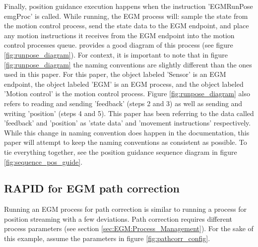 \documentclass{cslthse-msc}
\begin{document}
Finally, position guidance execution happens when the instruction 'EGMRunPose emgProc' is called. While running, the EGM process will: sample the state from the motion control process, send the state data to the EGM endpoint, and place any motion instructions it receives from the EGM endpoint into the motion control processes queue. \cite[Sec. 9.3.2.3]{ABB:controller_software} provides a good diagram of this process (see figure \ref{fig:runpose_diagram}). For context, it is important to note that in figure \ref{fig:runpose_diagram} the naming conventions are slightly different than the ones used in this paper. For this paper, the object labeled 'Sensor' is an EGM endpoint, the object labeled 'EGM' is an EGM process, and the object labeled 'Motion control' is the motion control process. Figure \ref{fig:runpose_diagram} also refers to reading and sending 'feedback' (steps 2 and 3) as well as sending and writing 'position' (steps 4 and 5). This paper has been referring to the data called 'feedback' and 'position' as 'state data' and 'movement instructions' respectively. While this change in naming convention does happen in the documentation, this paper will attempt to keep the naming conventions as consistent as possible. To tie everything together, see the position guidance sequence diagram in figure \ref{fig:sequence_pos_guide}. \par






\subsection{RAPID for EGM path correction}
\label{sec:EGM:Rapid_Programs:corr}
Running an EGM process for path correction is similar to running a process for position streaming with a few deviations. Path correction requires different process parameters (see section \ref{sec:EGM:Process_Management}). For the sake of this example, assume the parameters in figure \ref{fig:pathcorr_config}.
\end{document}
